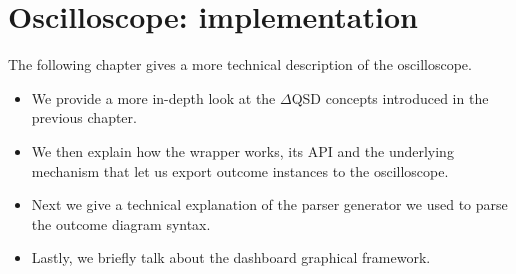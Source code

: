 \chapter{Oscilloscope: implementation}
    The following chapter gives a more technical description of the oscilloscope.
    \begin{itemize} 
        \item We provide a more in-depth look at the $\Delta$QSD concepts introduced in the previous chapter.
        \item We then explain how the wrapper works, its API and the underlying mechanism that let us export outcome instances to the oscilloscope.
        \item Next we give a technical explanation of the parser generator we used to parse the outcome diagram syntax.
        \item Lastly, we briefly talk about the dashboard graphical framework.
    \end{itemize}

    
    
    
    

